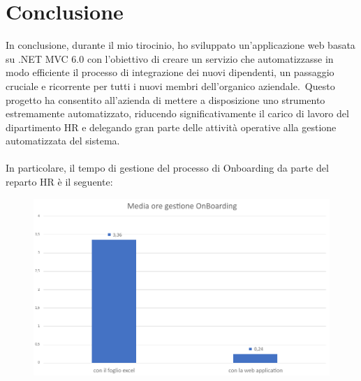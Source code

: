 \chapter*{Conclusione} %
%
In conclusione, durante il mio tirocinio, ho sviluppato un'applicazione web basata su .NET MVC 6.0 con 
l'obiettivo di creare un servizio che automatizzasse in modo efficiente il 
processo di integrazione dei nuovi dipendenti, un passaggio cruciale e ricorrente per 
tutti i nuovi membri dell'organico aziendale.\ Questo progetto ha consentito 
all'azienda di mettere a disposizione uno strumento estremamente automatizzato, riducendo 
significativamente il carico di lavoro del dipartimento HR e delegando gran parte delle 
attività operative alla gestione automatizzata del sistema.
\\ \\ 
In particolare, il tempo di gestione del processo di Onboarding da parte del reparto HR  è il seguente:

\begin{figure}[H]
	\centering
	\includegraphics[width=\textwidth]{img/conclusione1.png}
	\label{fig:conclusione1}
	\caption[media ore di gestione del processo di OnBoarding]{}
\end{figure}

